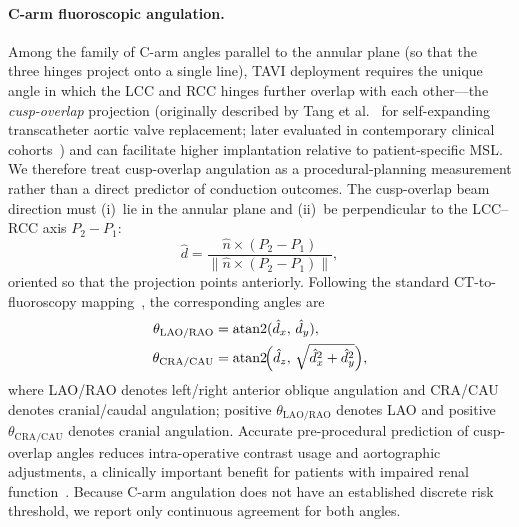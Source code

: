 \documentclass[conference]{IEEEtran}
\begin{document}
\paragraph{C-arm fluoroscopic angulation.}
{\color{red} Among the family of C-arm angles parallel to the annular plane (so that the three hinges project onto a single line), TAVI deployment requires the unique angle in which the LCC and RCC hinges further overlap with each other---the \emph{cusp-overlap} projection (originally described by Tang et al.~\cite{Tang2018_cusp_overlap_intro} for self-expanding transcatheter aortic valve replacement; later evaluated in contemporary clinical cohorts~\cite{Pascual2022_cusp_overlap,Lemarchand2026_cusp_overlap}) and can facilitate higher implantation relative to patient-specific MSL. We therefore treat cusp-overlap angulation as a procedural-planning measurement rather than a direct predictor of conduction outcomes.} The cusp-overlap beam direction must (i)~lie in the annular plane and (ii)~be perpendicular to the LCC--RCC axis $P_2 - P_1$:
\begin{equation}
  \hat{d} = \frac{\hat{n} \times (P_2 - P_1)}{\| \hat{n} \times (P_2 - P_1) \|},
  \label{eq:cusp_overlap}
\end{equation}
oriented so that the projection points anteriorly. Following the standard CT-to-fluoroscopy mapping~\cite{Achenbach2013_annular_plane,Arnold2012_carm_projection}, the corresponding angles are
\begin{align}
  \theta_{\text{LAO/RAO}} &= \operatorname{atan2}(\hat{d}_x,\, \hat{d}_y), \\
  \theta_{\text{CRA/CAU}} &= \operatorname{atan2}\!\Bigl(\hat{d}_z,\, \sqrt{\hat{d}_x^2 + \hat{d}_y^2}\Bigr),
  \label{eq:carm}
\end{align}
where LAO/RAO denotes left/right anterior oblique angulation and CRA/CAU denotes cranial/caudal angulation; positive $\theta_{\text{LAO/RAO}}$ denotes LAO and positive $\theta_{\text{CRA/CAU}}$ denotes cranial angulation. Accurate pre-procedural prediction of cusp-overlap angles reduces intra-operative contrast usage and aortographic adjustments, a clinically important benefit for patients with impaired renal function~\cite{Gurvitch2010_tavi_angulation}. Because C-arm angulation does not have an established discrete risk threshold, we report only continuous agreement for both angles.
\end{document}
